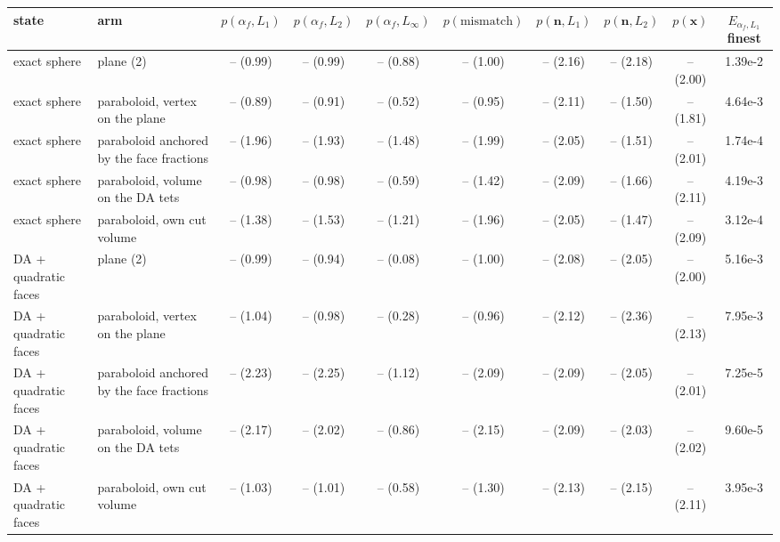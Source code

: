 \begin{tabular}{llcccccccc}
\toprule
state & arm & $p(\alpha_f, L_1)$ & $p(\alpha_f, L_2)$ & $p(\alpha_f, L_\infty)$ & $p(\text{mismatch})$ & $p(\mathbf{n}, L_1)$ & $p(\mathbf{n}, L_2)$ & $p(\mathbf{x})$ & $E_{\alpha_f, L_1}$ finest \\
\midrule
exact sphere & plane (2) & -- (0.99) & -- (0.99) & -- (0.88) & -- (1.00) & -- (2.16) & -- (2.18) & -- (2.00) & 1.39e-2 \\
exact sphere & paraboloid, vertex on the plane & -- (0.89) & -- (0.91) & -- (0.52) & -- (0.95) & -- (2.11) & -- (1.50) & -- (1.81) & 4.64e-3 \\
exact sphere & paraboloid anchored by the face fractions & -- (1.96) & -- (1.93) & -- (1.48) & -- (1.99) & -- (2.05) & -- (1.51) & -- (2.01) & 1.74e-4 \\
exact sphere & paraboloid, volume on the DA tets & -- (0.98) & -- (0.98) & -- (0.59) & -- (1.42) & -- (2.09) & -- (1.66) & -- (2.11) & 4.19e-3 \\
exact sphere & paraboloid, own cut volume & -- (1.38) & -- (1.53) & -- (1.21) & -- (1.96) & -- (2.05) & -- (1.47) & -- (2.09) & 3.12e-4 \\
DA + quadratic faces & plane (2) & -- (0.99) & -- (0.94) & -- (0.08) & -- (1.00) & -- (2.08) & -- (2.05) & -- (2.00) & 5.16e-3 \\
DA + quadratic faces & paraboloid, vertex on the plane & -- (1.04) & -- (0.98) & -- (0.28) & -- (0.96) & -- (2.12) & -- (2.36) & -- (2.13) & 7.95e-3 \\
DA + quadratic faces & paraboloid anchored by the face fractions & -- (2.23) & -- (2.25) & -- (1.12) & -- (2.09) & -- (2.09) & -- (2.05) & -- (2.01) & 7.25e-5 \\
DA + quadratic faces & paraboloid, volume on the DA tets & -- (2.17) & -- (2.02) & -- (0.86) & -- (2.15) & -- (2.09) & -- (2.03) & -- (2.02) & 9.60e-5 \\
DA + quadratic faces & paraboloid, own cut volume & -- (1.03) & -- (1.01) & -- (0.58) & -- (1.30) & -- (2.13) & -- (2.15) & -- (2.11) & 3.95e-3 \\
\bottomrule
\end{tabular}
